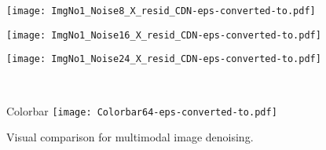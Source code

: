 \documentclass{article}
\begin{document}
\begin{figure*}[th]
\begin{multicols}{2}
		\begin{minipage}[b]{0.1\linewidth}
		\end{minipage} 
		\begin{minipage}[b]{0.28\linewidth}
			\centering
			\texttt{[image: ImgNo1\_Noise8\_X\_resid\_CDN-eps-converted-to.pdf]}
		\end{minipage} 
		\begin{minipage}[b]{0.28\linewidth}
			\centering
			\texttt{[image: ImgNo1\_Noise16\_X\_resid\_CDN-eps-converted-to.pdf]}
		\end{minipage} 
		\begin{minipage}[b]{0.28\linewidth}
			\centering
			\texttt{[image: ImgNo1\_Noise24\_X\_resid\_CDN-eps-converted-to.pdf]}
		\end{minipage} 
		\\
		\begin{minipage}[b]{0.1\linewidth}
			\centering	%
		\end{minipage}
		\begin{minipage}[b]{0.28\linewidth}
		\end{minipage} 
		\begin{minipage}[b]{0.28\linewidth}
		\end{minipage} 
		\begin{minipage}[b]{0.28\linewidth}
		\end{minipage}
	\end{multicols}	
	
	\vspace{-0.8cm}
	
	\begin{multicols}{1}  
	\begin{minipage}[b]{0.98\linewidth}{\footnotesize Colorbar}
		\texttt{[image: Colorbar64-eps-converted-to.pdf]}
	\end{minipage}
	\end{multicols}	

	\vspace{-0.6cm}

	\caption{Visual comparison for multimodal image denoising.}
	\label{Fig:DenoisedIms}
\end{figure*}
\end{document}
